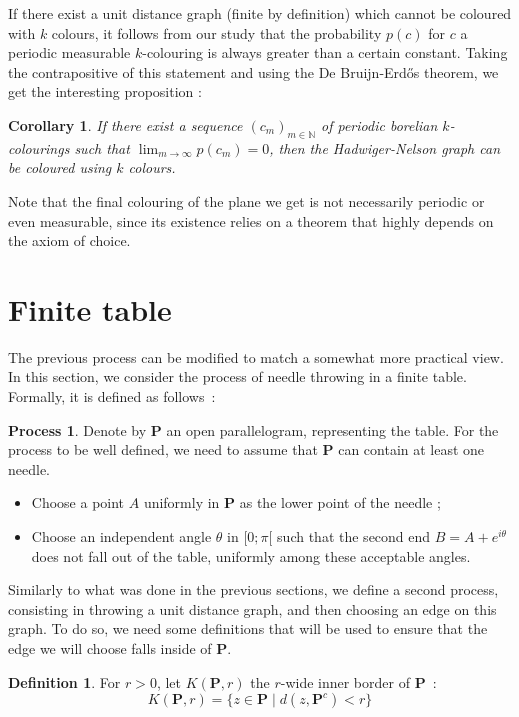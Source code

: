\documentclass[a4paper,11pt]{article}
\newtheorem{cons}{Corollary}
\theoremstyle{definition}
\newtheorem{definition}{Definition}
\newtheorem{process}{Process}
\theoremstyle{remark}
\begin{document}
If there exist a unit distance graph (finite by definition) which cannot 
be coloured with $k$ colours, it 
follows from our study that the probability $p(c)$ for $c$ a periodic measurable 
$k$-colouring is always greater than a certain constant. Taking the 
contrapositive of this statement and using the De Bruijn-Erdős theorem, we get  
the interesting proposition :
\begin{cons} \label{suite}
 If there exist a sequence $(c_m)_{m \in \mathbb{N}}$ of periodic borelian 
 $k$-colourings such that $\lim_{m \to \infty} p(c_m) = 0$, then the 
 Hadwiger-Nelson graph can be coloured using $k$ colours.
\end{cons}
Note that the final colouring of the plane we get is not necessarily periodic 
or even measurable, since its existence relies on a theorem that highly depends 
on the axiom of choice.

\section{Finite table} \label{fini}

The previous process can be modified to match a somewhat more practical view. 
In this section, we consider the process of needle throwing in a finite table. 
Formally, it is defined as follows~:

\begin{process} \label{encore}
Denote by $\mathbf{P}$ an open parallelogram, representing the table. For the 
process to be well defined, we need to assume that $\mathbf{P}$ can contain at
least one needle. 
\begin{itemize}
\item Choose a point $A$ uniformly in $\mathbf{P}$ as the lower point of the needle ;
\item Choose an independent angle $\theta$ in $[0 ; \pi[$ such that the second end 
$B = A+e^{i \theta}$ does not fall out of the table, uniformly among these 
acceptable angles.
\end{itemize}
\end{process}

Similarly to what was done in the previous sections, we define a second process, 
consisting in throwing a unit distance graph, and then choosing an edge on this 
graph. To do so, we need some definitions that will be used to ensure that the 
edge we will choose falls inside of $\mathbf{P}$.

\begin{definition}
For $r>0$, let $K(\mathbf{P},r)$ the $r$-wide inner border of $\mathbf{P}$~:
\[K(\mathbf{P},r) = \{ z \in \mathbf{P} \mid d(z,\mathbf{P}^c) < r\} \] 
\end{definition}
\end{document}
